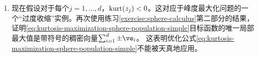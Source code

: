 \documentclass[../../book-main.tex]{subfiles}
\begin{document}
\begin{exercise}
\begin{enumerate}
        \item 现在假设对于每个$j =1, \dots, d$，$\mathop{\mathrm{kurt}}(z_j) < 0$。这对应于峰度最大化问题的一个“过度收缩”实例。再次使用练习\ref{exercise:sphere-calculus}第二部分的结果，证明\eqref{eq:kurtosis-maximization-sphere-population-simple}目标函数的唯一局部最大值是带符号的稠密向量$\sum_{i=1}^d \pm \ve_i$。
        这表明优化公式\eqref{eq:kurtosis-maximization-sphere-population-simple}不能被天真地应用。
    \end{enumerate}
\end{exercise}

\begin{exercise}\label{exercise:fast-ica-convergence}
\end{exercise}

\end{document}
